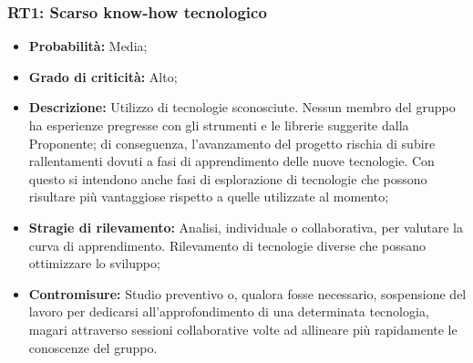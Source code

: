 \subsubsection{RT1: Scarso know-how tecnologico}
\begin{itemize}
    \item \textbf{Probabilità:} Media;
    \item \textbf{Grado di criticità:} Alto;
    \item \textbf{Descrizione:} Utilizzo di tecnologie sconosciute. Nessun membro del gruppo ha
    esperienze pregresse con gli strumenti e le librerie suggerite dalla Proponente; di conseguenza, l’avanzamento del progetto rischia di subire rallentamenti dovuti a fasi di apprendimento delle nuove tecnologie.
    Con questo si intendono anche fasi di esplorazione di tecnologie che possono risultare più vantaggiose rispetto a quelle utilizzate al momento;
    \item \textbf{Stragie di rilevamento:} Analisi, individuale o collaborativa, per valutare la
    curva di apprendimento. Rilevamento di tecnologie diverse che possano ottimizzare lo sviluppo;
    \item \textbf{Contromisure:} Studio preventivo o, qualora fosse necessario, sospensione del
    lavoro per dedicarsi all’approfondimento di una determinata tecnologia, magari attraverso sessioni collaborative volte ad allineare più rapidamente le conoscenze del gruppo.  
\end{itemize}
